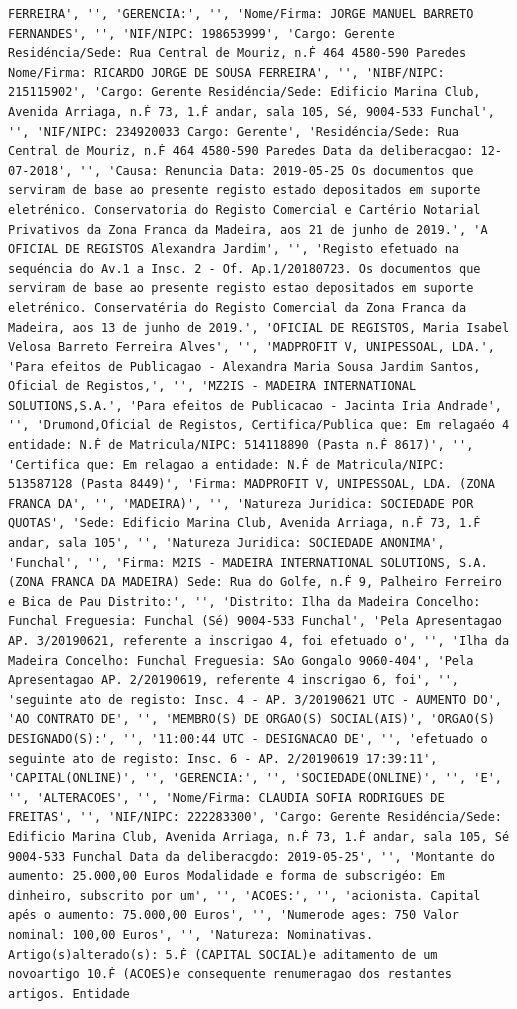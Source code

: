 \documentclass[
  12pt,
]{article}
\begin{document}
\begin{verbatim}
FERREIRA', '', 'GERENCIA:', '', 'Nome/Firma: JORGE MANUEL BARRETO FERNANDES', '', 'NIF/NIPC: 198653999', 'Cargo: Gerente Residéncia/Sede: Rua Central de Mouriz, n.Ḟ 464 4580-590 Paredes Nome/Firma: RICARDO JORGE DE SOUSA FERREIRA', '', 'NIBF/NIPC: 215115902', 'Cargo: Gerente Residéncia/Sede: Edificio Marina Club, Avenida Arriaga, n.Ḟ 73, 1.Ḟ andar, sala 105, Sé, 9004-533 Funchal', '', 'NIF/NIPC: 234920033 Cargo: Gerente', 'Residéncia/Sede: Rua Central de Mouriz, n.Ḟ 464 4580-590 Paredes Data da deliberacgao: 12-07-2018', '', 'Causa: Renuncia Data: 2019-05-25 Os documentos que serviram de base ao presente registo estado depositados em suporte eletrénico. Conservatoria do Registo Comercial e Cartério Notarial Privativos da Zona Franca da Madeira, aos 21 de junho de 2019.', 'A OFICIAL DE REGISTOS Alexandra Jardim', '', 'Registo efetuado na sequéncia do Av.1 a Insc. 2 - Of. Ap.1/20180723. Os documentos que serviram de base ao presente registo estao depositados em suporte eletrénico. Conservatéria do Registo Comercial da Zona Franca da Madeira, aos 13 de junho de 2019.', 'OFICIAL DE REGISTOS, Maria Isabel Velosa Barreto Ferreira Alves', '', 'MADPROFIT V, UNIPESSOAL, LDA.', 'Para efeitos de Publicagao - Alexandra Maria Sousa Jardim Santos, Oficial de Registos,', '', 'MZ2IS - MADEIRA INTERNATIONAL SOLUTIONS,S.A.', 'Para efeitos de Publicacao - Jacinta Iria Andrade', '', 'Drumond,Oficial de Registos, Certifica/Publica que: Em relagaéo 4 entidade: N.Ḟ de Matricula/NIPC: 514118890 (Pasta n.Ḟ 8617)', '', 'Certifica que: Em relagao a entidade: N.Ḟ de Matricula/NIPC: 513587128 (Pasta 8449)', 'Firma: MADPROFIT V, UNIPESSOAL, LDA. (ZONA FRANCA DA', '', 'MADEIRA)', '', 'Natureza Juridica: SOCIEDADE POR QUOTAS', 'Sede: Edificio Marina Club, Avenida Arriaga, n.Ḟ 73, 1.Ḟ andar, sala 105', '', 'Natureza Juridica: SOCIEDADE ANONIMA', 'Funchal', '', 'Firma: M2IS - MADEIRA INTERNATIONAL SOLUTIONS, S.A. (ZONA FRANCA DA MADEIRA) Sede: Rua do Golfe, n.Ḟ 9, Palheiro Ferreiro e Bica de Pau Distrito:', '', 'Distrito: Ilha da Madeira Concelho: Funchal Freguesia: Funchal (Sé) 9004-533 Funchal', 'Pela Apresentagao AP. 3/20190621, referente a inscrigao 4, foi efetuado o', '', 'Ilha da Madeira Concelho: Funchal Freguesia: SAo Gongalo 9060-404', 'Pela Apresentagao AP. 2/20190619, referente 4 inscrigao 6, foi', '', 'seguinte ato de registo: Insc. 4 - AP. 3/20190621 UTC - AUMENTO DO', 'AO CONTRATO DE', '', 'MEMBRO(S) DE ORGAO(S) SOCIAL(AIS)', 'ORGAO(S) DESIGNADO(S):', '', '11:00:44 UTC - DESIGNACAO DE', '', 'efetuado o seguinte ato de registo: Insc. 6 - AP. 2/20190619 17:39:11', 'CAPITAL(ONLINE)', '', 'GERENCIA:', '', 'SOCIEDADE(ONLINE)', '', 'E', '', 'ALTERACOES', '', 'Nome/Firma: CLAUDIA SOFIA RODRIGUES DE FREITAS', '', 'NIF/NIPC: 222283300', 'Cargo: Gerente Residéncia/Sede: Edificio Marina Club, Avenida Arriaga, n.Ḟ 73, 1.Ḟ andar, sala 105, Sé 9004-533 Funchal Data da deliberacgdo: 2019-05-25', '', 'Montante do aumento: 25.000,00 Euros Modalidade e forma de subscrigéo: Em dinheiro, subscrito por um', '', 'ACOES:', '', 'acionista. Capital apés o aumento: 75.000,00 Euros', '', 'Numerode ages: 750 Valor nominal: 100,00 Euros', '', 'Natureza: Nominativas. Artigo(s)alterado(s): 5.Ḟ (CAPITAL SOCIAL)e aditamento de um novoartigo 10.Ḟ (ACOES)e consequente renumeragao dos restantes artigos. Entidade 
\end{verbatim}
\end{document}
